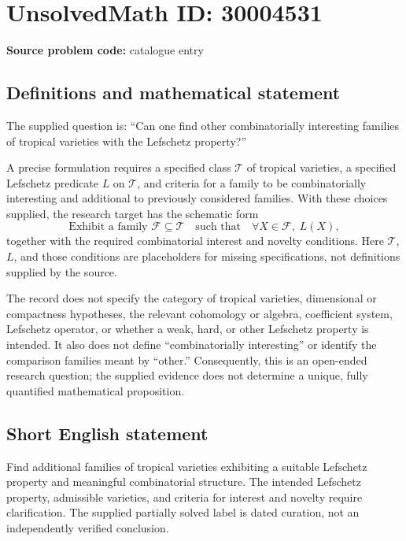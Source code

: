 \documentclass[11pt]{article}
\begin{document}
\section*{UnsolvedMath ID: 30004531}
\textbf{Source problem code:} catalogue entry
\subsection{Definitions and mathematical statement}
The supplied question is: ``Can one find other combinatorially interesting families of tropical varieties with the Lefschetz property?''

A precise formulation requires a specified class \(\mathscr T\) of tropical varieties, a specified Lefschetz predicate \(L\) on \(\mathscr T\), and criteria for a family to be combinatorially interesting and additional to previously considered families. With these choices supplied, the research target has the schematic form
\[
\text{Exhibit a family }\mathcal F\subseteq\mathscr T
\quad\text{such that}\quad
\forall X\in\mathcal F,\;L(X),
\]
together with the required combinatorial interest and novelty conditions. Here \(\mathscr T\), \(L\), and those conditions are placeholders for missing specifications, not definitions supplied by the source.

The record does not specify the category of tropical varieties, dimensional or compactness hypotheses, the relevant cohomology or algebra, coefficient system, Lefschetz operator, or whether a weak, hard, or other Lefschetz property is intended. It also does not define ``combinatorially interesting'' or identify the comparison families meant by ``other.'' Consequently, this is an open-ended research question; the supplied evidence does not determine a unique, fully quantified mathematical proposition.
\subsection{Short English statement}
Find additional families of tropical varieties exhibiting a suitable Lefschetz property and meaningful combinatorial structure. The intended Lefschetz property, admissible varieties, and criteria for interest and novelty require clarification. The supplied partially solved label is dated curation, not an independently verified conclusion.
\end{document}
